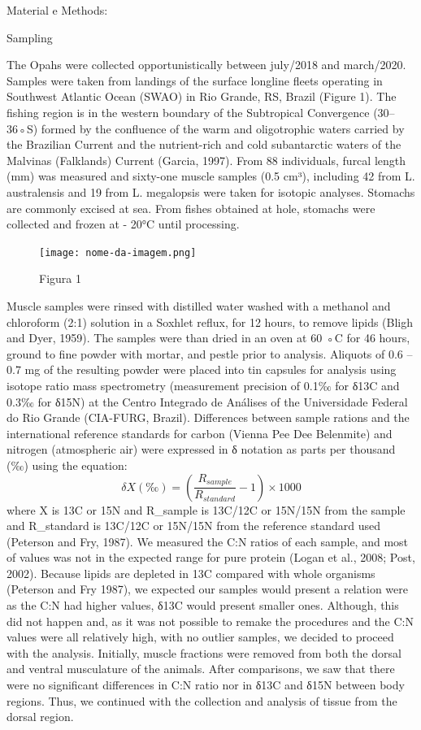\documentclass[
]{article}
\begin{document}
Material e Methods:

Sampling

The Opahs were collected opportunistically between july/2018 and
march/2020. Samples were taken from landings of the surface longline
fleets operating in Southwest Atlantic Ocean (SWAO) in Rio Grande, RS,
Brazil (Figure 1). The fishing region is in the western boundary of the
Subtropical Convergence (30--36◦S) formed by the confluence of the warm
and oligotrophic waters carried by the Brazilian Current and the
nutrient-rich and cold subantarctic waters of the Malvinas (Falklands)
Current (Garcia, 1997). From 88 individuals, furcal length (mm) was
measured and sixty-one muscle samples (0.5 cm³), including 42 from L.
australensis and 19 from L. megalopsis were taken for isotopic analyses.
Stomachs are commonly excised at sea. From fishes obtained at hole,
stomachs were collected and frozen at - 20°C until processing.

\begin{figure}
\centering
\texttt{[image: nome-da-imagem.png]}
\caption{Figura 1}
\end{figure}

Muscle samples were rinsed with distilled water washed with a methanol
and chloroform (2:1) solution in a Soxhlet reflux, for 12 hours, to
remove lipids (Bligh and Dyer, 1959). The samples were than dried in an
oven at 60 ◦C for 46 hours, ground to fine powder with mortar, and
pestle prior to analysis. Aliquots of 0.6 -- 0.7 mg of the resulting
powder were placed into tin capsules for analysis using isotope ratio
mass spectrometry (measurement precision of 0.1‰ for δ13C and 0.3‰ for
δ15N) at the Centro Integrado de Análises of the Universidade Federal do
Rio Grande (CIA-FURG, Brazil). Differences between sample rations and
the international reference standards for carbon (Vienna Pee Dee
Belenmite) and nitrogen (atmospheric air) were expressed in δ notation
as parts per thousand (‰) using the equation: \[
\delta X (‰) = \left( \frac{R_{sample}}{R_{standard}} - 1 \right) \times 1000
\] where X is 13C or 15N and R\_sample is 13C/12C or 15N/15N from the
sample and R\_standard is 13C/12C or 15N/15N from the reference standard
used (Peterson and Fry, 1987). We measured the C:N ratios of each
sample, and most of values was not in the expected range for pure
protein (Logan et al., 2008; Post, 2002). Because lipids are depleted in
13C compared with whole organisms (Peterson and Fry 1987), we expected
our samples would present a relation were as the C:N had higher values,
δ13C would present smaller ones. Although, this did not happen and, as
it was not possible to remake the procedures and the C:N values were all
relatively high, with no outlier samples, we decided to proceed with the
analysis. Initially, muscle fractions were removed from both the dorsal
and ventral musculature of the animals. After comparisons, we saw that
there were no significant differences in C:N ratio nor in δ13C and δ15N
between body regions. Thus, we continued with the collection and
analysis of tissue from the dorsal region.
\end{document}
